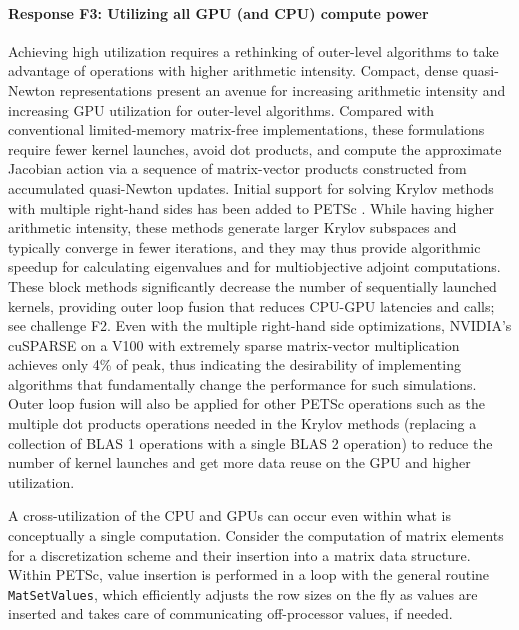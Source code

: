 \documentclass[10pt,journal,compsoc]{IEEEtran}
\begin{document}

\paragraph{Response F3: Utilizing all GPU (and CPU) compute power}

Achieving high utilization requires a rethinking of outer-level algorithms to take
advantage of operations with higher arithmetic intensity.
Compact, dense quasi-Newton representations present an avenue for increasing arithmetic intensity and increasing GPU utilization for outer-level algorithms.
Compared with conventional limited-memory matrix-free implementations, these formulations require fewer kernel launches, avoid dot products, and compute the approximate Jacobian action via a sequence of matrix-vector products constructed from accumulated quasi-Newton updates.
Initial support
for solving Krylov methods with multiple right-hand sides has
 been added to PETSc \cite{KSPHPDDM}. While having higher
arithmetic intensity, these methods generate larger Krylov subspaces and typically converge
in fewer iterations, and they may thus provide algorithmic speedup for calculating eigenvalues and for multiobjective adjoint computations.
These block methods significantly decrease the number of sequentially launched kernels, providing outer loop fusion
that reduces CPU\hyp{}GPU latencies and calls; see challenge F2. Even with the multiple right-hand side optimizations, NVIDIA's cuSPARSE on a V100
with extremely sparse matrix-vector multiplication  achieves only 4\% of peak, thus indicating the desirability of implementing algorithms that 
fundamentally change the performance for such simulations.
Outer loop fusion will also be applied for other PETSc operations such as the multiple dot products 
operations needed in the Krylov methods (replacing a collection of BLAS 1 operations with a single BLAS 2 operation) to reduce
the number of kernel launches and get more data reuse on the GPU and higher utilization.

A cross-utilization of the CPU and GPUs can occur even within what is
conceptually a single computation. Consider the computation of matrix elements
for a discretization scheme and their insertion into a matrix data
structure. Within PETSc, value insertion is performed in a loop with the
general routine {\tt MatSetValues}, which efficiently adjusts the row sizes
on the fly as values are inserted and takes care of communicating off-processor
values, if needed. 
\end{document}
